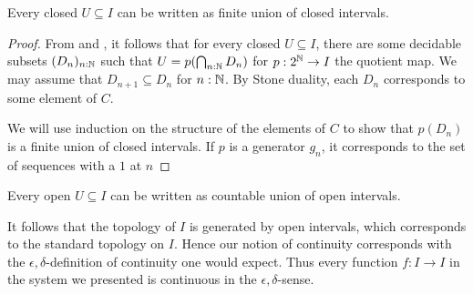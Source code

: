 \begin{lemma}
  Every closed $U\subseteq I$ can be written as finite union of closed intervals.
\end{lemma}
\begin{proof}
  From  and , it follows that for every closed $U\subseteq I$, 
  there are some decidable subsets $(D_n)_{n:\mathbb{N}}$ such that $U = p(\bigcap_{n:\mathbb{N}} D_n)$ for $p:2^{\mathbb{N}}\to I$ the quotient map. 
  We may assume that $D_{n+1} \subseteq D_n$ for $n:\mathbb{N}$. 
  By Stone duality, each $D_n$ corresponds to some element of $C$. 

  We will use induction on the structure of the elements of $C$ to show that $p(D_n)$ is a finite union of closed intervals. 
  If $p$ is a generator $g_n$, it corresponds to the set of sequences with a $1$ at $n$


\end{proof}


\begin{corollary}
  Every open $U\subseteq I$ can be written as countable union of open intervals.
\end{corollary} 

\begin{remark}
  It follows that the topology of $I$ is generated by open intervals, 
  which corresponds to the standard topology on $I$. 
  Hence our notion of continuity corresponds with the $\epsilon,\delta$-definition of continuity one would expect. 
  Thus every function $f:I\to I$ in the system we presented is continuous in the $\epsilon,\delta$-sense. 
\end{remark}
